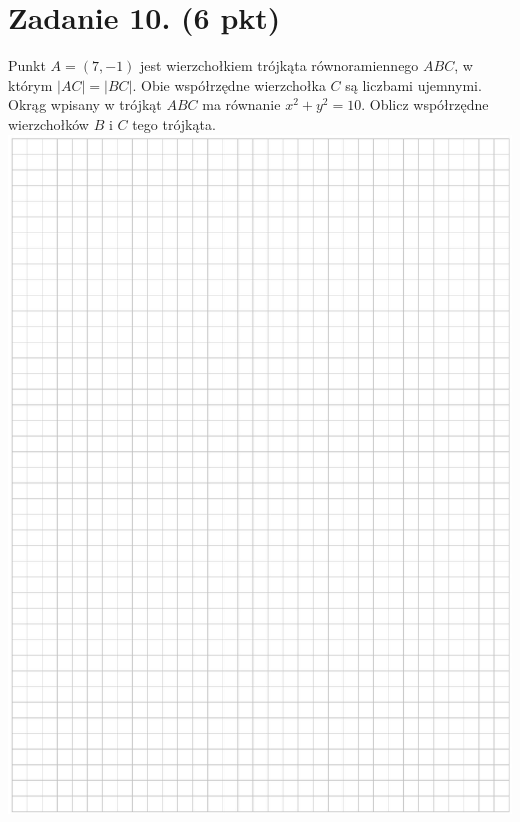 \documentclass[10pt]{article}
\begin{document}
\section*{Zadanie 10. (6 pkt)}
Punkt \(A=(7,-1)\) jest wierzchołkiem trójkąta równoramiennego \(A B C\), w którym \(|A C|=|B C|\). Obie współrzędne wierzchołka \(C\) są liczbami ujemnymi. Okrąg wpisany w trójkąt \(A B C\) ma równanie \(x^{2}+y^{2}=10\). Oblicz współrzędne wierzchołków \(B\) i \(C\) tego trójkąta.\\
\includegraphics[max width=\textwidth, center]{2024_11_21_7379bf55d75dd0fc4c58g-16}\\
\end{document}
